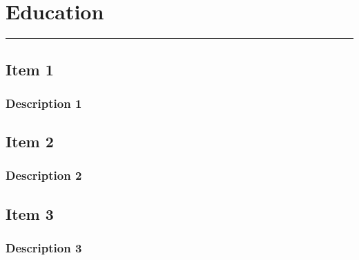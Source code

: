 \documentclass[11pt]{article}
\begin{document}
        \section{Education}
		\hrule \hfill
			\subsection{Item 1}
				\subsubsection{Description 1}
			\subsection{Item 2}
				\subsubsection{Description 2}
			\subsection{Item 3}
				\subsubsection{Description 3}
 
\end{document}

